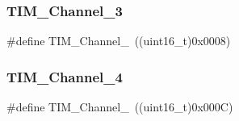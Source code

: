 \subsubsection{\texorpdfstring{TIM\_Channel\_3}{TIM\_Channel\_3}}
{\footnotesize\ttfamily \#define T\+I\+M\+\_\+\+Channel\+\_~((uint16\+\_\+t)0x0008)}

\mbox{\label{group___t_i_m___channel_ga7414888c40d066af235bc1f80b99bd9d}} 
\subsubsection{\texorpdfstring{TIM\_Channel\_4}{TIM\_Channel\_4}}
{\footnotesize\ttfamily \#define T\+I\+M\+\_\+\+Channel\+\_~((uint16\+\_\+t)0x000\+C)}

